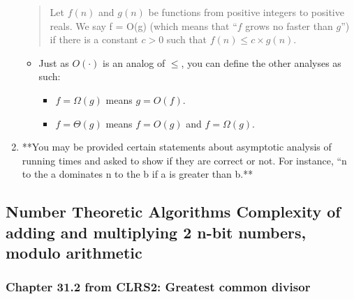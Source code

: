 \documentclass[a4paper,11pt]{article}
\begin{document}
\begin{enumerate}
  \begin{quote}
  Let $f(n)$ and $g(n)$ be functions from positive integers to positive
  reals. We say f = O(g) (which means that ``$f$ grows no faster than
  $g$'') if there is a constant $c > 0$ such that
  $f(n) \le c \times g(n)$.
  \end{quote}

  \begin{itemize}
  \itemsep1pt\parskip0pt
  \item
    Just as $O(\cdot)$ is an analog of $\le$, you can define the other
    analyses as such:

    \begin{itemize}
    \itemsep1pt\parskip0pt
    \item
      $f = \Omega(g)$ means $g = O(f)$.
    \item
      $f = \Theta(g)$ means $f = O(g)$ and $f = \Omega(g)$.
    \end{itemize}
  \end{itemize}
\item
  **You may be provided certain statements about asymptotic analysis of
  running times and asked to show if they are correct or not. For
  instance, ``n to the a dominates n to the b if a is greater than b.**
\end{enumerate}

\subsection{Number Theoretic Algorithms Complexity of adding and
multiplying 2 n-bit numbers, modulo
arithmetic}\label{number-theoretic-algorithms-complexity-of-adding-and-multiplying-2-n-bit-numbers-modulo-arithmetic}

\subsubsection{Chapter 31.2 from CLRS2: Greatest common
divisor}\label{chapter-31.2-from-clrs2-greatest-common-divisor}
\end{document}

